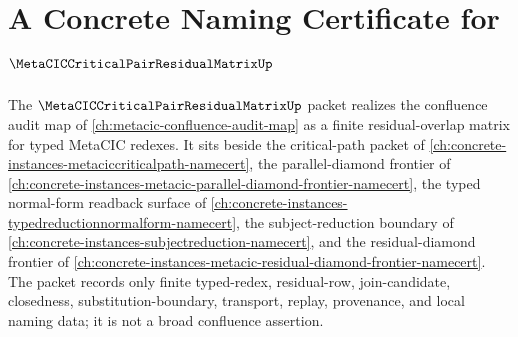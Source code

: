 \chapter{A Concrete Naming Certificate for $\MetaCICCriticalPairResidualMatrixUp$}
\label{ch:concrete-instances-metacic-critical-pair-residual-matrix-namecert}

The $\MetaCICCriticalPairResidualMatrixUp$ packet realizes the confluence audit map of \autoref{ch:metacic-confluence-audit-map} as a finite residual-overlap matrix for typed MetaCIC redexes. It sits beside the critical-path packet of \autoref{ch:concrete-instances-metaciccriticalpath-namecert}, the parallel-diamond frontier of \autoref{ch:concrete-instances-metacic-parallel-diamond-frontier-namecert}, the typed normal-form readback surface of \autoref{ch:concrete-instances-typedreductionnormalform-namecert}, the subject-reduction boundary of \autoref{ch:concrete-instances-subjectreduction-namecert}, and the residual-diamond frontier of \autoref{ch:concrete-instances-metacic-residual-diamond-frontier-namecert}. The packet records only finite typed-redex, residual-row, join-candidate, closedness, substitution-boundary, transport, replay, provenance, and local naming data; it is not a broad confluence assertion.



